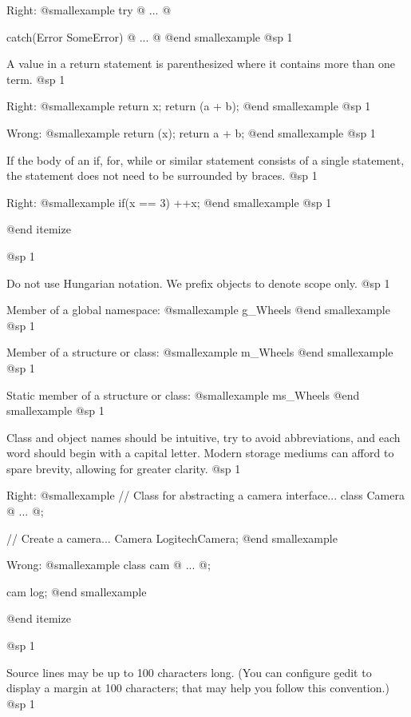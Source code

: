 Right:
@smallexample
try
@{
    ...
@}

catch(Error SomeError)
@{
    ...
@}
@end smallexample
@sp 1

\item
A value in a return statement is parenthesized where it contains more than one term.
@sp 1

Right:
@smallexample
return x;
return (a + b);
@end smallexample
@sp 1

Wrong:
@smallexample
return (x);
return a + b;
@end smallexample
@sp 1

\item
If the body of an if, for, while or similar statement consists of a single statement, the statement does not need to be surrounded by braces.
@sp 1

Right:
@smallexample
if(x == 3)
  ++x;
@end smallexample
@sp 1

@end itemize

@sp 1

\itemize
\item
Do not use Hungarian notation. We prefix objects to denote scope only.
@sp 1

Member of a global namespace:
@smallexample
g_Wheels
@end smallexample
@sp 1

Member of a structure or class:
@smallexample
m_Wheels
@end smallexample
@sp 1

Static member of a structure or class:
@smallexample
ms_Wheels
@end smallexample
@sp 1

\item
Class and object names should be intuitive, try to avoid abbreviations, and each word should begin with a capital letter. Modern storage mediums can afford to spare brevity, allowing for greater clarity.
@sp 1

Right:
@smallexample
// Class for abstracting a camera interface...
class Camera
@{
    ...
@};

// Create a camera...
Camera LogitechCamera;
@end smallexample

Wrong:
@smallexample
class cam
@{
    ...
@};

cam log;
@end smallexample

@end itemize

@sp 1
\itemize
\item
Source lines may be up to 100 characters long. (You can configure gedit to display a margin at 100 characters; that may help you follow this convention.)
@sp 1

